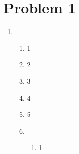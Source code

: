 \documentclass[12pt]{article}
\begin{document}
\section*{Problem 1}
\begin{enumerate}[label=(\alph*)]
  \item 
    \begin{enumerate}[label=\roman*]
      \item 1
      \item 2
      \item 3
      \item 4
      \item 5
      \item 
        \begin{enumerate}[label=\arabic*]
          \item 1
        \end{enumerate}
    \end{enumerate}
\end{enumerate}
\end{document}
